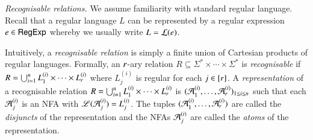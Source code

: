 \smallskip
\noindent \emph{Recognisable relations.} 
We assume familiarity with standard regular language. Recall that a regular language $L$ can be represented by a regular expression $e\in {\sf RegExp}$ whereby we usually write $ L=\mathcal{L}(e)$. %

Intuitively, a \emph{recognisable relation} is simply a finite union of Cartesian products of regular languages. Formally, an $r$-ary relation $R\subseteq \Sigma^*\times \cdots\times \Sigma^*$ is \emph{recognisable} if $R=\bigcup_{i=1}^n L^{(i)}_1\times \cdots\times L^{(i)}_r$ where $L^{(i)}_j$ is regular for each $j\in [r]$. A \emph{representation} of a recognisable relation $R=\bigcup_{i=1}^n L^{(i)}_1\times \cdots\times L^{(i)}_r$ is $(\mathcal{A}^{(i)}_1, \ldots, \mathcal{A}^{(i)}_r)_{1 \le i \le n}$ such that each $\mathcal{A}^{(i)}_j$ is an NFA with $\mathscr{L}(\mathcal{A}^{(i)}_j)=L^{(i)}_j$. The tuples $(\mathcal{A}^{(i)}_1, \ldots, \mathcal{A}^{(i)}_r)$ are called the \emph{disjuncts} of the representation and the NFAs $\mathcal{A}^{(i)}_j$ are called the \emph{atoms} of the representation.




 



